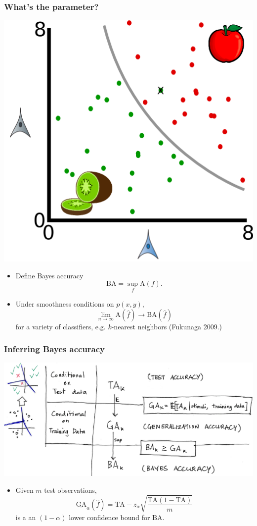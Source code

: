 \documentclass{beamer}
\begin{document}
\begin{frame}
\frametitle{What's the parameter?}
\begin{center}
\includegraphics[scale = 0.3]{intro4.png}
\end{center}
\begin{itemize}
\item Define Bayes accuracy
\[
\text{BA} = \sup_f \text{A}(f).
\]
\item Under smoothness conditions on $p(x, y)$,
\[\lim_{n \to \infty} \text{A}(\hat{f}) \to \text{BA}(\hat{f})\]
for a variety of classifiers, e.g. $k$-nearest neighbors (Fukunaga 2009.)
\end{itemize}
\end{frame}

\begin{frame}
\frametitle{Inferring Bayes accuracy}
\begin{center}
\includegraphics[scale = 0.3]{ta_to_ba.png}
\end{center}
\begin{itemize}
\item Given $m$ test observations,
\[
\underline{\text{GA}}_\alpha(\hat{f}) = \text{TA} - z_\alpha\sqrt{\frac{\text{TA}(1-\text{TA})}{m}}
\]
is a an $(1-\alpha)$ lower confidence bound for $\text{BA}$.
\end{itemize}
\end{frame}
\end{document}
